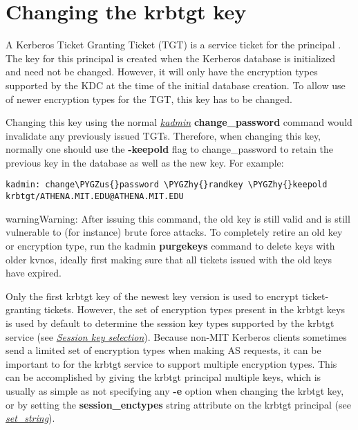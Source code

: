 \documentclass[letterpaper,10pt,english]{sphinxmanual}
\def\PYGZus{\char`\_}
\def\PYGZhy{\char`\-}
\begin{document}
\section{Changing the krbtgt key}
\label{admin/database:changing-krbtgt-key}\label{admin/database:changing-the-krbtgt-key}
A Kerberos Ticket Granting Ticket (TGT) is a service ticket for the
principal .  The key for this principal is created
when the Kerberos database is initialized and need not be changed.
However, it will only have the encryption types supported by the KDC
at the time of the initial database creation.  To allow use of newer
encryption types for the TGT, this key has to be changed.

Changing this key using the normal {\hyperref[admin/admin_commands/kadmin_local:kadmin-1]{\emph{kadmin}}}
\textbf{change\_password} command would invalidate any previously issued
TGTs.  Therefore, when changing this key, normally one should use the
\textbf{-keepold} flag to change\_password to retain the previous key in the
database as well as the new key.  For example:

\begin{Verbatim}[commandchars=\\\{\}]
kadmin: change\PYGZus{}password \PYGZhy{}randkey \PYGZhy{}keepold krbtgt/ATHENA.MIT.EDU@ATHENA.MIT.EDU
\end{Verbatim}

\begin{notice}{warning}{Warning:}
After issuing this command, the old key is still valid
and is still vulnerable to (for instance) brute force
attacks.  To completely retire an old key or encryption
type, run the kadmin \textbf{purgekeys} command to delete keys
with older kvnos, ideally first making sure that all
tickets issued with the old keys have expired.
\end{notice}

Only the first krbtgt key of the newest key version is used to encrypt
ticket-granting tickets.  However, the set of encryption types present
in the krbtgt keys is used by default to determine the session key
types supported by the krbtgt service (see
{\hyperref[admin/enctypes:session-key-selection]{\emph{Session key selection}}}).  Because non-MIT Kerberos clients
sometimes send a limited set of encryption types when making AS
requests, it can be important to for the krbtgt service to support
multiple encryption types.  This can be accomplished by giving the
krbtgt principal multiple keys, which is usually as simple as not
specifying any \textbf{-e} option when changing the krbtgt key, or by
setting the \textbf{session\_enctypes} string attribute on the krbtgt
principal (see {\hyperref[admin/admin_commands/kadmin_local:set-string]{\emph{set\_string}}}).
\end{document}
